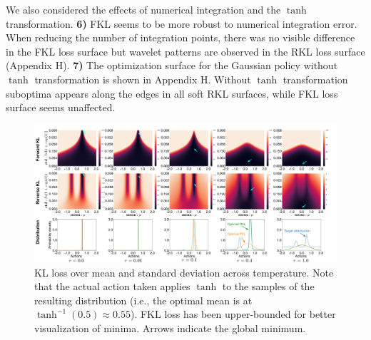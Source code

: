\documentclass[twoside,11pt]{article}
\begin{document}
We also considered the effects of numerical integration and the $\tanh$ transformation.
\textbf{6)} FKL seems to be more robust to numerical integration error. When reducing the number of integration points, there was no visible difference in the FKL loss surface but wavelet patterns are observed in the RKL loss surface (Appendix H).
\textbf{7)} The optimization surface for the Gaussian policy without $\tanh$ transformation is shown in Appendix H. Without $\tanh$ transformation suboptima appears along the edges in all soft RKL surfaces, while FKL loss surface seems unaffected.

\begin{figure}
    \centering
    \includegraphics[width=0.99\columnwidth]{figs/bandit/trueQ/heatmaps/heatmap_combined.pdf}
    \caption{KL loss over mean and standard deviation across temperature. Note that the actual action taken applies $\tanh$ to the samples of the resulting distribution (i.e., the optimal mean is at $\tanh^{-1}(0.5) \approx 0.55$). FKL loss has been upper-bounded for better visualization of minima. Arrows indicate the global minimum.}
    \label{fig:bandit-heatmap}
\end{figure}

\end{document}
